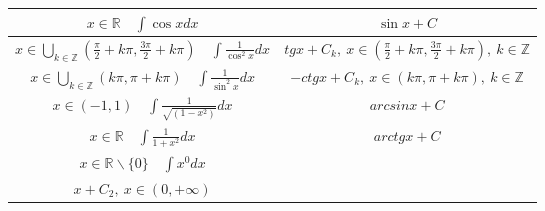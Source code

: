 \documentclass{article}
\begin{document}
\begin{tabular}{ |c|c| }
    $x \in \mathbb{R} \quad \int \cos x dx$                                                                          & $ \sin x + C$                                                                          \\ \hline
    $x \in \bigcup_{k \in \mathbb{Z}} (\frac{\pi}{2} + k\pi, \frac{3\pi}{2} + k\pi)\quad \int \frac{1}{\cos^2 x} dx$ & $ tg x + C_k,\ x \in (\frac{\pi}{2} + k\pi, \frac{3\pi}{2} + k\pi),\ k \in \mathbb{Z}$ \\ \hline
    $x \in \bigcup_{k \in \mathbb{Z}} (k\pi, \pi + k\pi)\quad \int \frac{1}{\sin^2 x} dx$                            & $ -ctg x + C_k,\ x \in (k\pi, \pi + k\pi),\ k \in \mathbb{Z}$                          \\ \hline
    $x \in (-1, 1) \quad \int \frac{1}{\sqrt{(1 - x^2)}} dx                      $                                   & $ arcsinx + C$                                                                         \\ \hline
    $x \in \mathbb{R} \quad \int \frac{1}{1+x^2} dx                              $                                   & $ arctg x + C$                                                                         \\ \hline
    $x \in \mathbb{R}\backslash \{0\} \quad \int x^{0} dx$                                                           &
    \makecell{
    $x + C_1,\ x \in (-\infty, 0)$                                                                                                                                                                            \\
        $x + C_2,\ x \in (0, +\infty)$
    }                                                                                                                                                                                                         \\ \hline
\end{tabular}
\end{document}
